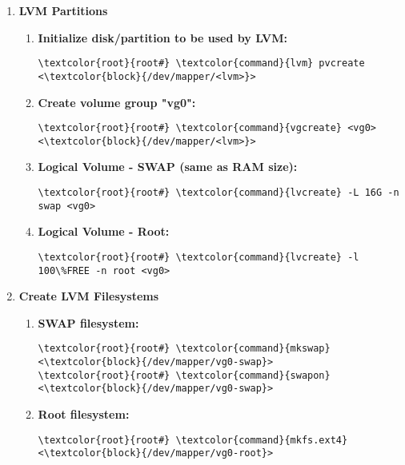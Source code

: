 \documentclass[10pt, a4paper, onecolumn, openany]{book} %
\begin{document}
\begin{enumerate}
\item \textbf{LVM Partitions}
    \begin{enumerate}
        \item \textbf{Initialize disk/partition to be used by LVM:}
\begin{Verbatim}[commandchars=\\\{\}]
\textcolor{root}{root#} \textcolor{command}{lvm} pvcreate <\textcolor{block}{/dev/mapper/<lvm>}>
\end{Verbatim}
        \item \textbf{Create volume group "vg0":}
\begin{Verbatim}[commandchars=\\\{\}]
\textcolor{root}{root#} \textcolor{command}{vgcreate} <vg0> <\textcolor{block}{/dev/mapper/<lvm>}>
\end{Verbatim}        
    \item \textbf{Logical Volume - SWAP (same as RAM size):}
\begin{Verbatim}[commandchars=\\\{\}]
\textcolor{root}{root#} \textcolor{command}{lvcreate} -L 16G -n swap <vg0>
\end{Verbatim}      
    \item \textbf{Logical Volume - Root:}
\begin{Verbatim}[commandchars=\\\{\}]
\textcolor{root}{root#} \textcolor{command}{lvcreate} -l 100\%FREE -n root <vg0>
\end{Verbatim}    
    \end{enumerate}

\item \textbf{Create LVM Filesystems}
    \begin{enumerate}
        \item \textbf{SWAP filesystem:}
\begin{Verbatim}[commandchars=\\\{\}]
\textcolor{root}{root#} \textcolor{command}{mkswap} <\textcolor{block}{/dev/mapper/vg0-swap}>
\textcolor{root}{root#} \textcolor{command}{swapon} <\textcolor{block}{/dev/mapper/vg0-swap}>
\end{Verbatim}           
        \item \textbf{Root filesystem:}
\begin{Verbatim}[commandchars=\\\{\}]
\textcolor{root}{root#} \textcolor{command}{mkfs.ext4} <\textcolor{block}{/dev/mapper/vg0-root}>
\end{Verbatim}   
    \end{enumerate}
\end{enumerate}
\end{document}
